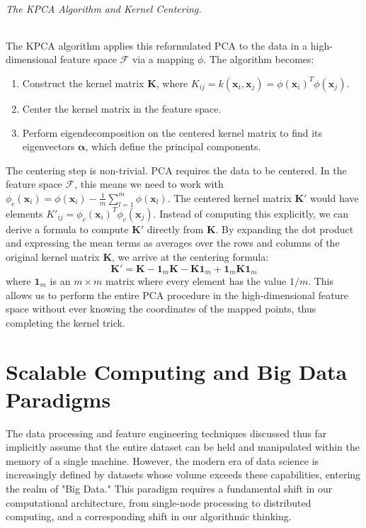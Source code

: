 \paragraph{The KPCA Algorithm and Kernel Centering.}
The KPCA algorithm applies this reformulated PCA to the data in a high-dimensional feature space $\mathcal{F}$ via a mapping $\phi$. The algorithm becomes:
\begin{enumerate}
    \item Construct the kernel matrix $\mathbf{K}$, where $K_{ij} = k(\mathbf{x}_i, \mathbf{x}_j) = \phi(\mathbf{x}_i)^T \phi(\mathbf{x}_j)$.
    \item Center the kernel matrix in the feature space.
    \item Perform eigendecomposition on the centered kernel matrix to find its eigenvectors $\boldsymbol{\alpha}$, which define the principal components.
\end{enumerate}
The centering step is non-trivial. PCA requires the data to be centered. In the feature space $\mathcal{F}$, this means we need to work with $\phi_c(\mathbf{x}_i) = \phi(\mathbf{x}_i) - \frac{1}{m}\sum_{l=1}^m \phi(\mathbf{x}_l)$. The centered kernel matrix $\mathbf{K}'$ would have elements $K'_{ij} = \phi_c(\mathbf{x}_i)^T \phi_c(\mathbf{x}_j)$. Instead of computing this explicitly, we can derive a formula to compute $\mathbf{K}'$ directly from $\mathbf{K}$. By expanding the dot product and expressing the mean terms as averages over the rows and columns of the original kernel matrix $\mathbf{K}$, we arrive at the centering formula:
$$ \mathbf{K}' = \mathbf{K} - \mathbf{1}_m\mathbf{K} - \mathbf{K}\mathbf{1}_m + \mathbf{1}_m\mathbf{K}\mathbf{1}_m $$
where $\mathbf{1}_m$ is an $m \times m$ matrix where every element has the value $1/m$. This allows us to perform the entire PCA procedure in the high-dimensional feature space without ever knowing the coordinates of the mapped points, thus completing the kernel trick.

\part{Scalable Computing and Big Data Paradigms}

The data processing and feature engineering techniques discussed thus far implicitly assume that the entire dataset can be held and manipulated within the memory of a single machine. However, the modern era of data science is increasingly defined by datasets whose volume exceeds these capabilities, entering the realm of "Big Data." This paradigm requires a fundamental shift in our computational architecture, from single-node processing to distributed computing, and a corresponding shift in our algorithmic thinking.

